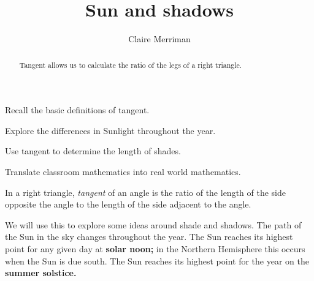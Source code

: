 \documentclass[noauthor,nooutcomes,handout,hints]{ximera}
\title{Sun and shadows} \author{Claire Merriman}
\begin{document}
\begin{abstract}
Tangent allows us to calculate the ratio of the legs of a right triangle.
\end{abstract}
\maketitle

\begin{listOutcomes}
\item  Recall the basic definitions of tangent.
\item Explore the differences in Sunlight throughout the year.
\item Use tangent to determine the length of shades.
\item Translate classroom mathematics into real world mathematics.
\end{listOutcomes}


\mynewpage


\begin{definition}
 In a right triangle, \emph{tangent} of an angle is the ratio of the length of the side opposite the angle to the length of the side adjacent to the angle. 
\end{definition}
We will use this to explore some ideas around shade and shadows.  The
path of the Sun in the sky changes throughout the year. The Sun
reaches its highest point for any given day at \textbf{solar noon;} in
the Northern Hemisphere this occurs when the Sun is due south. The Sun
reaches its highest point for the year on the \textbf{summer solstice.}

\begin{center}
 
\end{center}
\end{document}

